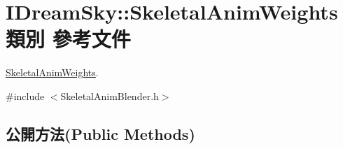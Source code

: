 \hypertarget{class_i_dream_sky_1_1_skeletal_anim_weights}{}\section{I\+Dream\+Sky\+:\+:Skeletal\+Anim\+Weights 類別 參考文件}
\label{class_i_dream_sky_1_1_skeletal_anim_weights}


\hyperlink{class_i_dream_sky_1_1_skeletal_anim_weights}{Skeletal\+Anim\+Weights}.  




{\ttfamily \#include $<$Skeletal\+Anim\+Blender.\+h$>$}

\subsection*{公開方法(Public Methods)}
